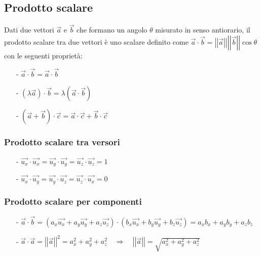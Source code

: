 \documentclass[a4paper]{article}
\newcommand\vmod[1]{\left|\left|{#1}\right|\right|}
\begin{document}
\subsection{Prodotto scalare}
Dati due vettori \(\vec{a}\) e \(\vec{b}\) che formano un angolo \(\theta\) misurato in senso antiorario, il prodotto scalare tra
due vettori è uno scalare definito come \(\vec{a} \cdot \vec{b} = \vmod{\vec{a}} \vmod{\vec{b}} \cos \theta\)
con le seguenti proprietà:
\begin{itemize}[topsep=3pt, itemsep=0pt]
	\item[-] \(\vec{a} \cdot \vec{b} = \vec{a} \cdot \vec{b}\)
	\item[-] \((\lambda \vec{a}) \cdot \vec{b} = \lambda (\vec{a} \cdot \vec{b})\)
	\item[-] \((\vec{a} + \vec{b}) \cdot \vec{c} = \vec{a} \cdot \vec{c} + \vec{b} \cdot \vec{c}\)
\end{itemize}

\subsubsection*{Prodotto scalare tra versori}
\begin{itemize}[topsep=3pt, itemsep=0pt]
	\item[-] \(\vec{u_x} \cdot \vec{u_x} = \vec{u_y} \cdot \vec{u_y} = \vec{u_z} \cdot \vec{u_z} = 1\)
	\item[-] \(\vec{u_x} \cdot \vec{u_y} = \vec{u_y} \cdot \vec{u_z} = \vec{u_z} \cdot \vec{u_x} = 0\)
\end{itemize}

\subsubsection*{Prodotto scalare per componenti}
\begin{itemize}[topsep=3pt, itemsep=0pt]
	\item[-] \(\vec{a} \cdot \vec{b} = \left(a_x \vec{u_x} + a_y \vec{u_y} + a_z \vec{u_z}\right) \cdot \left(b_x \vec{u_x} + b_y \vec{u_y} + b_z \vec{u_z}\right) = a_x b_x + a_y b_y + a_z b_z\)
	\item[-] \(\vec{a} \cdot \vec{a} = \vmod{\vec{a}}^2 = a_x^2 + a_y^2 + a_z^2 \quad \Rightarrow \quad \vmod{\vec{a}} = \sqrt{a_x^2 + a_y^2 + a_z^2}\)
\end{itemize}
\end{document}
